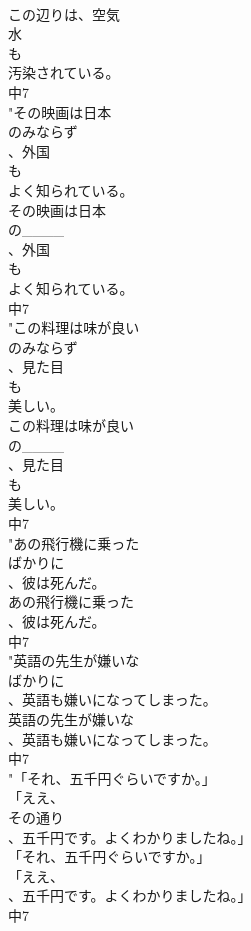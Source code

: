 \documentclass[8pt]{extreport}
\begin{document}
\begin{CJK}{UTF8}{min}
\\	この辺りは、空気
\\	水
\\	も
\\	汚染されている。
\\	中7
\\	"その映画は日本
\\	のみならず
\\	、外国
\\	も
\\	よく知られている。
\\	その映画は日本
\\	の____
\\	、外国
\\	も
\\	よく知られている。
\\	中7
\\	"この料理は味が良い
\\	のみならず
\\	、見た目
\\	も
\\	美しい。
\\	この料理は味が良い
\\	の____
\\	、見た目
\\	も
\\	美しい。
\\	中7
\\	"あの飛行機に乗った
\\	ばかりに
\\	、彼は死んだ。
\\	あの飛行機に乗った
\\	、彼は死んだ。
\\	中7
\\	"英語の先生が嫌いな
\\	ばかりに
\\	、英語も嫌いになってしまった。
\\	英語の先生が嫌いな
\\	、英語も嫌いになってしまった。
\\	中7
\\	"「それ、五千円ぐらいですか。」
\\	「ええ、
\\	その通り
\\	、五千円です。よくわかりましたね。」
\\	「それ、五千円ぐらいですか。」
\\	「ええ、
\\	、五千円です。よくわかりましたね。」
\\	中7

\end{CJK}
\end{document}
